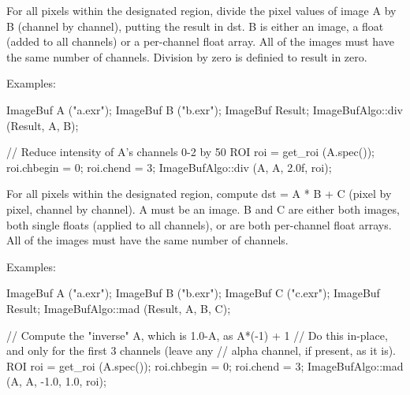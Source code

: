  
For all pixels within the designated region, divide the pixel values
of image {\cf A} by {\cf B} (channel by channel), putting the result in
{\cf dst}.  {\cf B} is either an image,
a float (added to all channels) or a per-channel float array.
All of the images must have the same number of channels.
Division by zero is definied to result in zero.

\smallskip
\noindent Examples:
\begin{code}
    ImageBuf A ("a.exr");
    ImageBuf B ("b.exr");
    ImageBuf Result;
    ImageBufAlgo::div (Result, A, B);

    // Reduce intensity of A's channels 0-2 by 50%
    ROI roi = get_roi (A.spec());
    roi.chbegin = 0;  roi.chend = 3;
    ImageBufAlgo::div (A, A, 2.0f, roi);
\end{code}
\apiend


 

For all pixels within the designated region, compute {\cf dst = A * B + C}
(pixel by pixel, channel by channel). {\cf A} must be an image. {\cf B} and
{\cf C} are either both images, both single floats (applied to all
channels), or are both per-channel float arrays. All of the images must have
the same number of channels.

\smallskip
\noindent Examples:
\begin{code}
    ImageBuf A ("a.exr");
    ImageBuf B ("b.exr");
    ImageBuf C ("c.exr");
    ImageBuf Result;
    ImageBufAlgo::mad (Result, A, B, C);

    // Compute the "inverse" A, which is 1.0-A, as A*(-1) + 1
    // Do this in-place, and only for the first 3 channels (leave any
    // alpha channel, if present, as it is).
    ROI roi = get_roi (A.spec());
    roi.chbegin = 0;  roi.chend = 3;
    ImageBufAlgo::mad (A, A, -1.0, 1.0, roi);
\end{code}
\apiend


